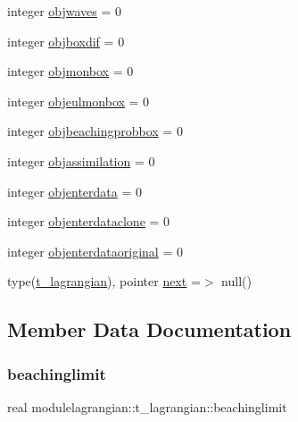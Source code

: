 \begin{DoxyCompactItemize}
\item 
integer \mbox{\hyperlink{structmodulelagrangian_1_1t__lagrangian_ada2214d9e4800bad378d93cb96b662ff}{objwaves}} = 0
\item 
integer \mbox{\hyperlink{structmodulelagrangian_1_1t__lagrangian_a5d04c5a1606d97f0f3cf804a4dbb0a56}{objboxdif}} = 0
\item 
integer \mbox{\hyperlink{structmodulelagrangian_1_1t__lagrangian_add810c90a1846ee870525fd11a7ab4b4}{objmonbox}} = 0
\item 
integer \mbox{\hyperlink{structmodulelagrangian_1_1t__lagrangian_a3b5fb0f4281d89e5fed3e4cd8a5e6381}{objeulmonbox}} = 0
\item 
integer \mbox{\hyperlink{structmodulelagrangian_1_1t__lagrangian_afe85dc75d9fc8a5a8dcfd4ce92852d43}{objbeachingprobbox}} = 0
\item 
integer \mbox{\hyperlink{structmodulelagrangian_1_1t__lagrangian_afaaab127700d544c17d6f5df61b7eb0c}{objassimilation}} = 0
\item 
integer \mbox{\hyperlink{structmodulelagrangian_1_1t__lagrangian_a47a7b0d5b64dff4442265b17ff00bd14}{objenterdata}} = 0
\item 
integer \mbox{\hyperlink{structmodulelagrangian_1_1t__lagrangian_aebcdf740b5855ef98122f30a67c11710}{objenterdataclone}} = 0
\item 
integer \mbox{\hyperlink{structmodulelagrangian_1_1t__lagrangian_aa0c8d20c16957c470027792051c75807}{objenterdataoriginal}} = 0
\item 
type(\mbox{\hyperlink{structmodulelagrangian_1_1t__lagrangian}{t\+\_\+lagrangian}}), pointer \mbox{\hyperlink{structmodulelagrangian_1_1t__lagrangian_aca59636c800250e7e17febbfbe61105f}{next}} =$>$ null()
\end{DoxyCompactItemize}


\subsection{Member Data Documentation}
\mbox{\label{structmodulelagrangian_1_1t__lagrangian_a5dbd87a11a96acaa1842f70337bc7e25}} 
\subsubsection{\texorpdfstring{beachinglimit}{beachinglimit}}
{\footnotesize\ttfamily real modulelagrangian\+::t\+\_\+lagrangian\+::beachinglimit\hspace{0.3cm}{\ttfamily [private]}}

